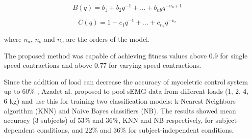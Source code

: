 \documentclass[letterpaper, 10 pt, conference]{ieeeconf}  %
\begin{document}
\begin{equation}
\label{eq:B}
B(q) = b_1 + b_2q^{-1}+...+b_{nb}q^{-{n_b}+1}
\end{equation}

\begin{equation}
\label{eq:C}
C(q) = 1+c_1q^{-1}+...+c_{n_c}q^{-n_c}
\end{equation}

where \(n_a\), \(n_b\) and \(n_c\) are the orders of the model.

The proposed method was capable of achieving fitness values above 0.9 for single speed contractions and above 0.77 for varying speed contractions.


Since the addition of load can decrease the accuracy of myoeletric control system up to 60\% \cite{Al-Timemy6610859}, Azadet al. \cite{Azab8037374} proposed to pool sEMG data from different loads (1, 2, 4, 6 kg) and use this for training two classification models: k-Nearest Neighbors algorithm (KNN) and Naive Bayes classifiers (NB). The results showed mean accuracy (3 subjects) of 53\% and 36\%, KNN and NB respectively, for subject-dependent conditions, and 22\% and 36\% for subject-independent conditions.


\end{document}
